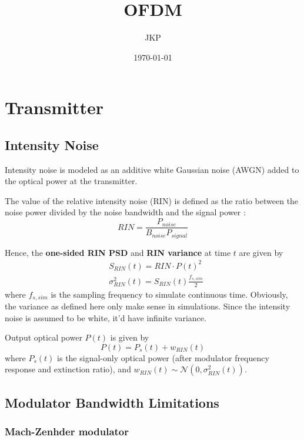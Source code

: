 \documentclass[a4paper]{article}
\title{OFDM}
\author{JKP}
\date{\today}
\begin{document}
\maketitle

\section{Transmitter}
\subsection{Intensity Noise}
Intensity noise is modeled as an additive white Gaussian noise (AWGN) added to the optical power at the transmitter.

The value of the relative intensity noise (RIN) is defined as the ratio between the noise power divided by the noise bandwidth and the signal power \cite{agilent-RIN-measurement}: 
\begin{equation}
RIN = \frac{P_{noise}}{B_{noise}P_{signal}}
\end{equation}

Hence, the \textbf{one-sided RIN PSD} and \textbf{RIN variance} at time $t$ are given by
\begin{align}
& S_{RIN}(t) = RIN\cdot P(t)^2 \\
& \sigma^2_{RIN}(t) = S_{RIN}(t)\frac{f_{s, sim}}{2}
\end{align}
where $f_{s, sim}$ is the sampling frequency to simulate continuous time. Obviously, the variance as defined here only make sense in simulations. Since the intensity noise is assumed to be white, it'd have infinite variance.

Output optical power $P(t)$ is given by
\begin{equation}
P(t) = P_s(t) + w_{RIN}(t)
\end{equation}
where $P_s(t)$ is the signal-only optical power (after modulator frequency response and extinction ratio), and $w_{RIN}(t)\sim\mathcal{N}(0, \sigma^2_{RIN}(t))$.

\subsection{Modulator Bandwidth Limitations}

\subsubsection{Mach-Zenhder modulator}
\cite{Barros2009, Ho2005}
\end{document}
